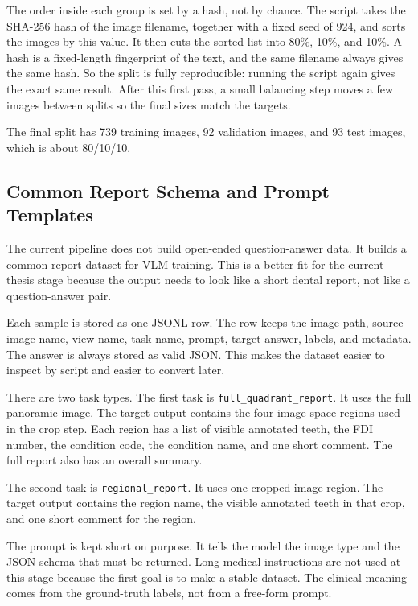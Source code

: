 \documentclass[a4paper,12pt]{report}
\begin{document}
The order inside each group is set by a hash, not by chance. The script takes the SHA-256 hash of the image filename, together with a fixed seed of 924, and sorts the images by this value. It then cuts the sorted list into 80\%, 10\%, and 10\%. A hash is a fixed-length fingerprint of the text, and the same filename always gives the same hash. So the split is fully reproducible: running the script again gives the exact same result. After this first pass, a small balancing step moves a few images between splits so the final sizes match the targets.

The final split has 739 training images, 92 validation images, and 93 test images, which is about 80/10/10.

\subsection{Common Report Schema and Prompt Templates}

The current pipeline does not build open-ended question-answer data. It builds a common report dataset for VLM training. This is a better fit for the current thesis stage because the output needs to look like a short dental report, not like a question-answer pair.

Each sample is stored as one JSONL row. The row keeps the image path, source image name, view name, task name, prompt, target answer, labels, and metadata. The answer is always stored as valid JSON. This makes the dataset easier to inspect by script and easier to convert later.

There are two task types. The first task is \texttt{full\_quadrant\_report}. It uses the full panoramic image. The target output contains the four image-space regions used in the crop step. Each region has a list of visible annotated teeth, the FDI number, the condition code, the condition name, and one short comment. The full report also has an overall summary.

The second task is \texttt{regional\_report}. It uses one cropped image region. The target output contains the region name, the visible annotated teeth in that crop, and one short comment for the region.

The prompt is kept short on purpose. It tells the model the image type and the JSON schema that must be returned. Long medical instructions are not used at this stage because the first goal is to make a stable dataset. The clinical meaning comes from the ground-truth labels, not from a free-form prompt.
\end{document}
